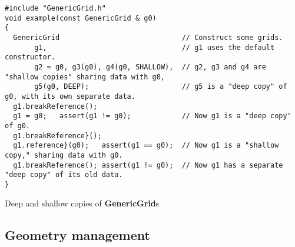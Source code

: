 \documentclass{article}
\begin{document}
{\small
\begin{verbatim}
#include "GenericGrid.h"   
void example(const GenericGrid & g0)
{ 
  GenericGrid                             // Construct some grids.
       g1,                                // g1 uses the default constructor. 
       g2 = g0, g3(g0), g4(g0, SHALLOW),  // g2, g3 and g4 are "shallow copies" sharing data with g0,
       g5(g0, DEEP);                      // g5 is a "deep copy" of g0, with its own separate data.
  g1.breakReference();
  g1 = g0;   assert(g1 != g0);            // Now g1 is a "deep copy" of g0.   
  g1.breakReference}();
  g1.reference}(g0);   assert(g1 == g0);  // Now g1 is a "shallow copy," sharing data with g0.
  g1.breakReference(); assert(g1 != g0);  // Now g1 has a separate "deep copy" of its old data.
}                                  
\end{verbatim}
}
{\center Deep and shallow copies of \textbf{GenericGrid}s\label{Example:GenericGrid:DataSharing}}

\subsection{Geometry management}
\label{GenericGrid:Geometry}
\end{document}
